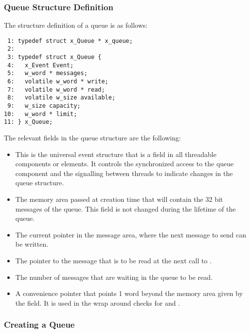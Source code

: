 \subsubsection{Queue Structure Definition}

The structure definition of a queue is as follows:

\bcode
\begin{verbatim}
 1: typedef struct x_Queue * x_queue;
 2:
 3: typedef struct x_Queue {
 4:   x_Event Event;
 5:   w_word * messages;
 6:   volatile w_word * write;
 7:   volatile w_word * read;
 8:   volatile w_size available;
 9:   w_size capacity;
10:   w_word * limit;
11: } x_Queue;
\end{verbatim}
\ecode

The relevant fields in the queue structure are the following:

\begin{itemize}
\item {} This is the universal event structure that is a field
in all threadable components or elements. It controls the synchronized access
to the queue component and the signalling between threads to indicate changes
in the queue structure.
\item {} The memory area passed at
creation time that will contain the 32 bit messages of the queue. This field
is not changed during the lifetime of the queue.
\item {} The current pointer in the message
area, where the next message to send can be written.
\item {} The pointer to the message that is
to be read at the next call to .
\item {} The number of messages that
are waiting in the queue to be read.
\item {} A convenience pointer that points
1 word beyond the memory area given by the  field. It is
used in the wrap around checks for  and .
\end{itemize}

\subsubsection{Creating a Queue}


